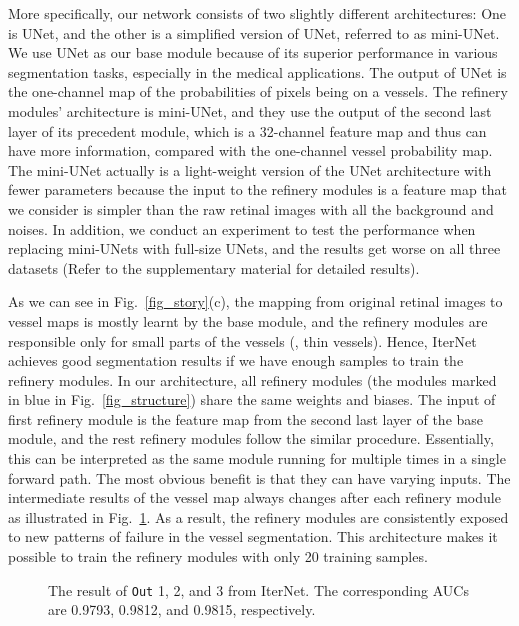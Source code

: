 \documentclass[10pt,twocolumn,letterpaper]{article}
\begin{document}
More specifically, our network consists of two slightly different architectures: One is UNet, and the other is a simplified version of UNet, referred to as mini-UNet. We use UNet as our base module because of its superior performance in various segmentation tasks, especially in the medical applications. The output of UNet is the one-channel map of the probabilities of pixels being on a vessels. The refinery modules' architecture is mini-UNet, and they use the output of the second last layer of its precedent module, which is a 32-channel feature map and thus can have more information, compared with the one-channel vessel probability map. The mini-UNet actually is a light-weight version of the UNet architecture with fewer parameters because the input to the refinery modules is a feature map that we consider is simpler than the raw retinal images with all the background and noises. 
In addition, we conduct an experiment to test the performance when replacing mini-UNets with full-size UNets, and the results get worse on all three datasets (Refer to the supplementary material for detailed results).

As we can see in Fig.~\ref{fig_story}(c), the mapping from original retinal images to vessel maps is mostly learnt by the base module, and the refinery modules are responsible only for small parts of the vessels (\eg, thin vessels). Hence, IterNet achieves good segmentation results if we have enough samples to train the refinery modules. In our architecture, all refinery modules (the modules marked in blue in Fig.~\ref{fig_structure}) share the same weights and biases. The input of first refinery module is the feature map from the second last layer of the base module, and the rest refinery modules follow the similar procedure. Essentially, this can be interpreted as the same module running for multiple times in a single forward path. The most obvious benefit is that they can have varying inputs. The intermediate results of the vessel map always changes after each refinery module as illustrated in Fig.~\ref{fig_iter}. As a result, the refinery modules are consistently exposed to new patterns of failure in the vessel segmentation. This architecture makes it possible to train the refinery modules with only 20 training samples.

\begin{figure}[!t]
	\setlength{\fboxsep}{0pt}\setlength{\fboxrule}{0.2pt}

	\centering
	\hfil
	\hfil
	\hfil
	\caption{The result of \texttt{Out} 1, 2, and 3 from IterNet. The corresponding AUCs are 0.9793, 0.9812, and 0.9815, respectively. }
	\label{fig_iter}
\end{figure}
\end{document}
